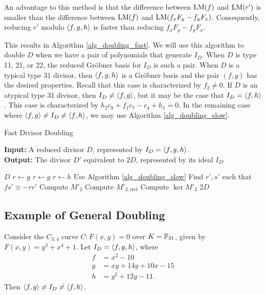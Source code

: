 An advantage to this method is that the difference between $\operatorname{LM}(f)$ and $\operatorname{LM}(r')$
is smaller than the difference between $\operatorname{LM}(f)$ and $\operatorname{LM}(f_xF_y - f_yF_x)$.
Consequently, reducing $r'$ modulo $\left\langle f,g,h \right\rangle$ is faster than reducing $f_xF_y - f_yF_x$.

This results in Algorithm \ref{alg_doubling_fast}.
We will use this algorithm to double $D$
when we have a pair of polynomials that generate $I_D$.
When $D$ is type 11, 21, or 22, the reduced Gr\"obner basis for $I_D$ is such a pair.
When $D$ is a typical type 31 divisor, then $\left\langle f,g,h \right\rangle$ is a Gr\"obner basis
and the pair $(f,g)$ has the desired properties.
Recall that this case is characterized by $f_2 \neq 0$.
If $D$ is an atypical type 31 divisor, then $I_D \neq \left\langle f,g \right\rangle$,
but it may be the case that $I_D = \left\langle f,h \right\rangle$.
This case is characterized by $h_2c_8 + f_1c_7 - c_4 + h_1 = 0$.
In the remaining case where $\left\langle f,g \right\rangle \neq I_D \neq \left\langle f,h \right\rangle$, we may use Algorithm \ref{alg_doubling_slow}.
\begin{algorithm}
  \label{alg_doubling_fast}
  \caption{Fast Divisor Doubling}
  {\bf Input:} A reduced divisor $D$, represented by $I_D = \left\langle f,g,h \right\rangle$. \\
  {\bf Output:} The divisor $D'$ equivalent to $2D$, represented by its ideal $I_{D'}$
  \begin{algorithmic}[1]
      \State \Return $D$
      \State $r \gets g$
        \State $r \gets g$
        \State $r \gets h$
      \Else
        \State Use Algorithm \ref{alg_doubling_slow}
      \EndIf
    \EndIf
    \State Find $r', s'$ such that $fs' \equiv -rr'$
    \State Compute $M'_2$
    \State Compute $M'_{2,\text{rref}}$
    \State Compute $\ker M'_2$
    \State \Return $2D$
  \end{algorithmic}
\end{algorithm}




\subsection{Example of General Doubling}

Consider the $C_{3,4}$ curve $C : F(x,y) = 0$ over $K = \mathbb{F}_{31}$,
given by $F(x,y) = y^3 + x^4 + 1$.
Let $I_D = \left\langle f,g,h \right\rangle$, where
\begin{align*}
  f &= x^2 - 10 \\
  g &= xy + 14y + 10x - 15 \\
  h &= y^2 + 12y - 11.
\end{align*}
Then $\left\langle f,g \right\rangle \neq I_D \neq \left\langle f,h \right\rangle$.

